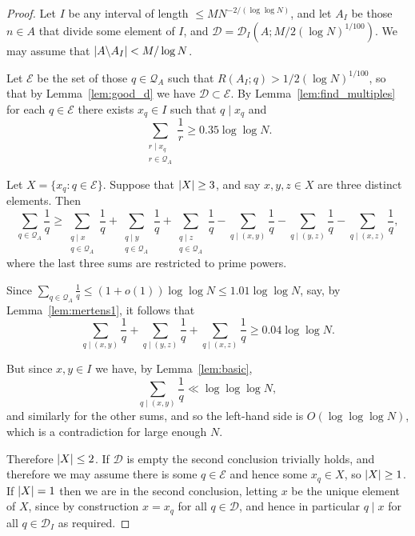\begin{proof}
Let $I$ be any interval of length $\leq MN^{-2/(\log\log N)}$, and let $A_I$ be those $n\in A$ that divide some element of $I$, and $\mathcal{D}=\mathcal{D}_I(A;M/2(\log N)^{1/100})$. We may assume that $\left\lvert A\backslash A_I\right\rvert< M/\log N$.

Let $\mathcal{E}$ be the set of those $q\in\mathcal{Q}_A$ such that $R(A_I;q)> 1/2(\log N)^{1/100}$, so that by Lemma~\ref{lem:good_d} we have $\mathcal{D}\subset \mathcal{E}$. By Lemma~\ref{lem:find_multiples} for each $q\in\mathcal{E}$ there exists $x_q\in I$ such that $q\mid x_q$ and
\[\sum_{\substack{r\mid x_q\\ r\in \mathcal{Q}_A}}\frac{1}{r}\geq 0.35\log\log N.\]


Let $X=\{x_q : q\in \mathcal{E}\}$. Suppose that $\left\lvert X\right\rvert\geq 3$, and say $x,y,z\in X$ are three distinct elements. Then
\[\sum_{q\in\mathcal{Q}_A}\frac{1}{q}\geq \sum_{\substack{q\mid x\\ q\in \mathcal{Q}_A}}\frac{1}{q}+\sum_{\substack{q\mid y\\ q\in \mathcal{Q}_A}}\frac{1}{q}+\sum_{\substack{q\mid z\\ q\in \mathcal{Q}_A}}\frac{1}{q}-\sum_{q\mid (x,y)}\frac{1}{q}-\sum_{q\mid (y,z)}\frac{1}{q}-\sum_{q\mid (x,z)}\frac{1}{q},\]
where the last three sums are restricted to prime powers.

Since $\sum_{q\in\mathcal{Q}_A}\frac{1}{q}\leq (1+o(1))\log\log N\leq 1.01\log\log N$, say, by Lemma~\ref{lem:mertens1}, it follows that
\[\sum_{q\mid (x,y)}\frac{1}{q}+\sum_{q\mid (y,z)}\frac{1}{q}+\sum_{q\mid (x,z)}\frac{1}{q}\geq 0.04\log\log N.\]

But since $x,y\in I$ we have, by Lemma~\ref{lem:basic},
  \[\sum_{q\mid (x,y)}\frac{1}{q}\ll \log\log\log N,\]
and similarly for the other sums, and so the left-hand side is $O(\log\log\log N)$, which is a contradiction for large enough $N$.

Therefore $\left\lvert X\right\rvert\leq 2$. If $\mathcal{D}$ is empty the second conclusion trivially holds, and therefore we may assume there is some $q\in \mathcal{E}$ and hence some $x_q\in X$, so $\left\lvert X\right\rvert\geq 1$. If $\left\lvert X\right\rvert=1$ then we are in the second conclusion, letting $x$ be the unique element of $X$, since by construction $x=x_q$ for all $q\in \mathcal{D}$, and hence in particular $q\mid x$ for all $q\in \mathcal{D}_I$ as required.


\end{proof}
